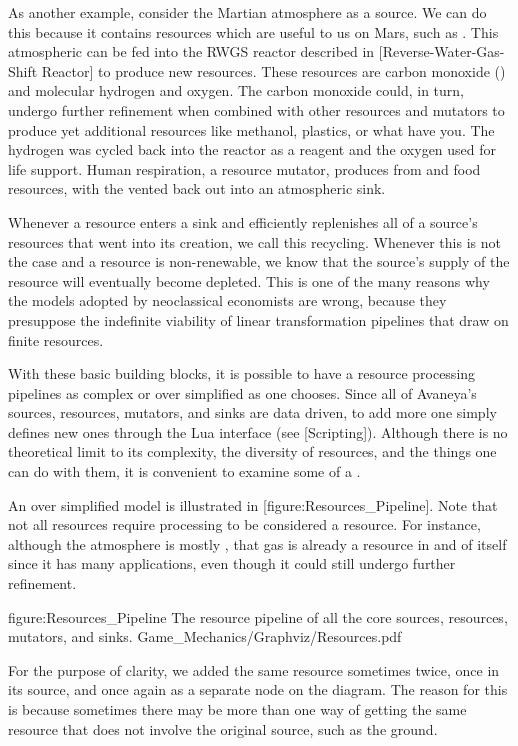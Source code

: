 As another example, consider the Martian atmosphere as a source. We can do this because it contains resources which are useful to us on Mars, such as . This atmospheric  can be fed into the RWGS reactor described in [Reverse-Water-Gas-Shift Reactor] to produce new resources. These resources are carbon monoxide () and molecular hydrogen and oxygen. The carbon monoxide could, in turn, undergo further refinement when combined with other resources and mutators to produce yet additional resources like methanol, plastics, or what have you. The hydrogen was cycled back into the reactor as a reagent and the oxygen used for life support. Human respiration, a resource mutator, produces  from  and food resources, with the  vented back out into an atmospheric sink.

Whenever a resource enters a sink and efficiently replenishes all of a source's resources that went into its creation, we call this recycling. Whenever this is not the case and a resource is non-renewable, we know that the source's supply of the resource will eventually become depleted. This is one of the many reasons why the models adopted by neoclassical economists are wrong, because they presuppose the indefinite viability of linear transformation pipelines that draw on finite resources.

With these basic building blocks, it is possible to have a resource processing pipelines as complex or over simplified as one chooses. Since all of Avaneya's sources, resources, mutators, and sinks are data driven, to add more one simply defines new ones through the Lua interface (see [Scripting]). Although there is no theoretical limit to its complexity, the diversity of resources, and the things one can do with them, it is convenient to examine some of a .

An over simplified model is illustrated in [figure:Resources_Pipeline]. Note that not all resources require processing to be considered a resource. For instance, although the atmosphere is mostly , that gas is already a resource in and of itself since it has many applications, even though it could still undergo further refinement.

\FullPageDiagram
    {figure:Resources_Pipeline}
    {The resource pipeline of all the core sources, resources, mutators, and sinks.}
    {Game_Mechanics/Graphviz/Resources.pdf}

For the purpose of clarity, we added the same resource sometimes twice, once in its source, and once again as a separate node on the diagram. The reason for this is because sometimes there may be more than one way of getting the same resource that does not involve the original source, such as the ground. 

